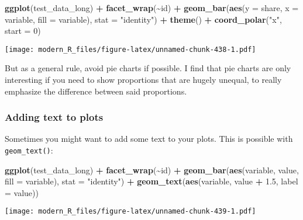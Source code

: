 \documentclass[
]{article}
\newenvironment{Shaded}{\begin{snugshade}}{\end{snugshade}}
\newcommand{\DataTypeTok}[1]{\textcolor[rgb]{0.13,0.29,0.53}{#1}}
\newcommand{\DecValTok}[1]{\textcolor[rgb]{0.00,0.00,0.81}{#1}}
\newcommand{\FloatTok}[1]{\textcolor[rgb]{0.00,0.00,0.81}{#1}}
\newcommand{\KeywordTok}[1]{\textcolor[rgb]{0.13,0.29,0.53}{\textbf{#1}}}
\newcommand{\NormalTok}[1]{#1}
\newcommand{\OperatorTok}[1]{\textcolor[rgb]{0.81,0.36,0.00}{\textbf{#1}}}
\newcommand{\StringTok}[1]{\textcolor[rgb]{0.31,0.60,0.02}{#1}}
\begin{document}
\begin{Shaded}
\begin{Highlighting}[]
\KeywordTok{ggplot}\NormalTok{(test\_data\_long) }\OperatorTok{+}
\StringTok{  }\KeywordTok{facet\_wrap}\NormalTok{(}\OperatorTok{\textasciitilde{}}\NormalTok{id) }\OperatorTok{+}
\StringTok{  }\KeywordTok{geom\_bar}\NormalTok{(}\KeywordTok{aes}\NormalTok{(}\DataTypeTok{y =}\NormalTok{ share, }\DataTypeTok{x =}\NormalTok{ variable, }\DataTypeTok{fill =}\NormalTok{ variable), }\DataTypeTok{stat =} \StringTok{"identity"}\NormalTok{) }\OperatorTok{+}
\StringTok{  }\KeywordTok{theme}\NormalTok{() }\OperatorTok{+}
\StringTok{  }\KeywordTok{coord\_polar}\NormalTok{(}\StringTok{"x"}\NormalTok{, }\DataTypeTok{start =} \DecValTok{0}\NormalTok{)}
\end{Highlighting}
\end{Shaded}

\texttt{[image: modern\_R\_files/figure-latex/unnamed-chunk-438-1.pdf]}

But as a general rule, avoid pie charts if possible. I find that pie charts are only interesting if
you need to show proportions that are hugely unequal, to really emphasize the difference between
said proportions.

\hypertarget{adding-text-to-plots}{%
\subsubsection{Adding text to plots}\label{adding-text-to-plots}}

Sometimes you might want to add some text to your plots. This is possible with \texttt{geom\_text()}:

\begin{Shaded}
\begin{Highlighting}[]
\KeywordTok{ggplot}\NormalTok{(test\_data\_long) }\OperatorTok{+}
\StringTok{  }\KeywordTok{facet\_wrap}\NormalTok{(}\OperatorTok{\textasciitilde{}}\NormalTok{id) }\OperatorTok{+}
\StringTok{  }\KeywordTok{geom\_bar}\NormalTok{(}\KeywordTok{aes}\NormalTok{(variable, value, }\DataTypeTok{fill =}\NormalTok{ variable), }\DataTypeTok{stat =} \StringTok{"identity"}\NormalTok{) }\OperatorTok{+}
\StringTok{  }\KeywordTok{geom\_text}\NormalTok{(}\KeywordTok{aes}\NormalTok{(variable, value }\OperatorTok{+}\StringTok{ }\FloatTok{1.5}\NormalTok{, }\DataTypeTok{label =}\NormalTok{ value))}
\end{Highlighting}
\end{Shaded}

\texttt{[image: modern\_R\_files/figure-latex/unnamed-chunk-439-1.pdf]}
\end{document}
